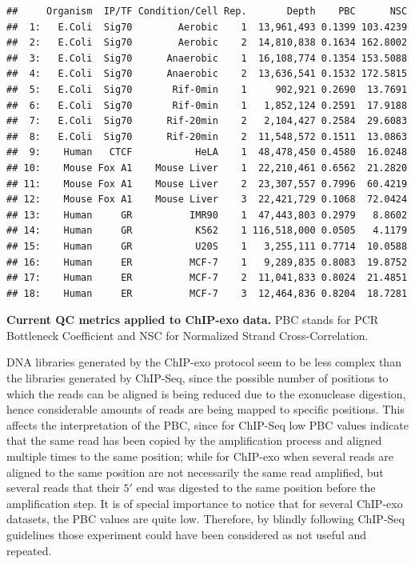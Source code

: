 \documentclass{bmcart}\usepackage[]{graphicx}\usepackage[]{color}
\makeatletter
\newenvironment{kframe}{%
 \def\at@end@of@kframe{}%
 \ifinner\ifhmode%
  \def\at@end@of@kframe{\end{minipage}}%
  \begin{minipage}{\columnwidth}%
 \fi\fi%
 \def\FrameCommand##1{\hskip\@totalleftmargin \hskip-\fboxsep
 \colorbox{shadecolor}{##1}\hskip-\fboxsep
     \hskip-\linewidth \hskip-\@totalleftmargin \hskip\columnwidth}%
 \MakeFramed {\advance\hsize-\width
   \@totalleftmargin\z@ \linewidth\hsize
   \@setminipage}}%
 {\par\unskip\endMakeFramed%
 \at@end@of@kframe}
\newenvironment{knitrout}{}{} %
\makeatother
\begin{document}
\begin{table}[h!]
  \centering


\begin{knitrout}
\color{fgcolor}\begin{kframe}
\begin{verbatim}
##     Organism  IP/TF Condition/Cell Rep.       Depth    PBC      NSC
##  1:   E.Coli  Sig70        Aerobic    1  13,961,493 0.1399 103.4239
##  2:   E.Coli  Sig70        Aerobic    2  14,810,838 0.1634 162.8002
##  3:   E.Coli  Sig70      Anaerobic    1  16,108,774 0.1354 153.5088
##  4:   E.Coli  Sig70      Anaerobic    2  13,636,541 0.1532 172.5815
##  5:   E.Coli  Sig70       Rif-0min    1     902,921 0.2690  13.7691
##  6:   E.Coli  Sig70       Rif-0min    1   1,852,124 0.2591  17.9188
##  7:   E.Coli  Sig70      Rif-20min    2   2,104,427 0.2584  29.6083
##  8:   E.Coli  Sig70      Rif-20min    2  11,548,572 0.1511  13.0863
##  9:    Human   CTCF           HeLA    1  48,478,450 0.4580  16.0248
## 10:    Mouse Fox A1    Mouse Liver    1  22,210,461 0.6562  21.2820
## 11:    Mouse Fox A1    Mouse Liver    2  23,307,557 0.7996  60.4219
## 12:    Mouse Fox A1    Mouse Liver    3  22,421,729 0.1068  72.0424
## 13:    Human     GR          IMR90    1  47,443,803 0.2979   8.8602
## 14:    Human     GR           K562    1 116,518,000 0.0505   4.1179
## 15:    Human     GR           U20S    1   3,255,111 0.7714  10.0588
## 16:    Human     ER          MCF-7    1   9,289,835 0.8083  19.8752
## 17:    Human     ER          MCF-7    2  11,041,833 0.8024  21.4851
## 18:    Human     ER          MCF-7    3  12,464,836 0.8204  18.7281
\end{verbatim}
\end{kframe}
\end{knitrout}
\caption{\textbf{Current QC metrics applied to ChIP-exo data.} PBC
  stands for PCR Bottleneck Coefficient and NSC for Normalized Strand
  Cross-Correlation.}
  \label{tab:qc} %
\end{table}

DNA libraries generated by the ChIP-exo protocol seem to be less
complex than the libraries generated by ChIP-Seq, since the possible
number of positions to which the reads can be aligned is being reduced
due to the exonuclease digestion, hence considerable amounts of reads
are being mapped to specific positions. This affects the
interpretation of the PBC, since for ChIP-Seq low PBC values indicate
that the same read has been copied by the amplification process and
aligned multiple times to the same position; while for ChIP-exo when
several reads are aligned to the same position are not necessarily the
same read amplified, but several reads that their $5\prime$ end was
digested to the same position before the amplification step. It is of
special importance to notice that for several ChIP-exo datasets, the
PBC values are quite low. Therefore, by blindly following ChIP-Seq
guidelines those experiment could have been considered as not useful
and repeated. 
\end{document}
